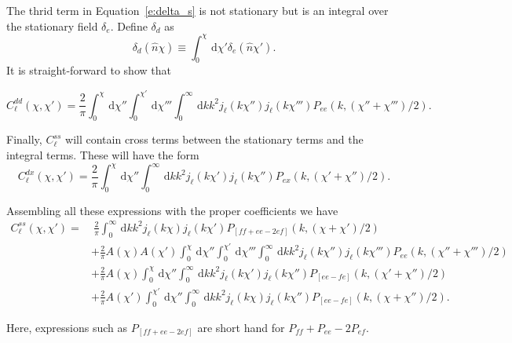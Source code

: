 \documentclass[twocolumn,prl,nofootinbib]{revtex4-1}
\newcommand{\ud}{\,\mathrm{d}}
\begin{document}
The thrid term in Equation~\ref{e:delta_s} is not stationary but is an integral
over the stationary field $\delta_e$.
Define $\delta_d$ as
\begin{equation}
    \delta_d(\hat n \chi) \equiv \int_0^\chi \ud \chi' \delta_e(\hat n \chi').
\end{equation}
It is straight-forward to show that
\begin{widetext}
\begin{equation}
C^{dd}_\ell(\chi,\chi')
    =
    \frac{2}{\pi}
    \int_0^\chi\ud\chi''
    \int_0^{\chi'}\ud\chi'''
    \int_0^\infty\ud k k^2 j_\ell(k\chi'') j_{\ell}(k\chi''')
    P_{ee}(k, (\chi''+\chi''')/2).
\end{equation}

Finally, $C^{ss}_\ell$ will contain cross terms between the stationary terms
and the integral terms.  These will have the form
\begin{equation}
C^{dx}_\ell(\chi,\chi')
    =
    \frac{2}{\pi}
    \int_0^\chi\ud\chi''
    \int_0^\infty\ud k k^2 
    j_\ell(k\chi') j_{\ell}(k\chi'')P_{ex}(k, (\chi' + \chi'')/2).
\end{equation}

Assembling all these expressions with the proper coefficients we have
\begin{align}
    \label{e:Clss}
C^{ss}_\ell(\chi,\chi') = &~
    \frac{2}{\pi}
    \int_0^\infty\ud k k^2
    j_\ell(k\chi) j_{\ell}(k\chi')
    P_{[ff + ee - 2ef]}(k, (\chi + \chi')/2)
    \nonumber\\
    & +
    \frac{2}{\pi}
    A(\chi) A(\chi')
    \int_0^\chi\ud\chi''
    \int_0^{\chi'}\ud\chi'''
    \int_0^\infty\ud k k^2 j_\ell(k\chi'') j_{\ell}(k\chi''')
    P_{ee}(k, (\chi''+\chi''')/2)
    \nonumber\\
    & +
    \frac{2}{\pi}
    A(\chi)
    \int_0^\chi\ud\chi''
    \int_0^\infty\ud k k^2 
    j_\ell(k\chi') j_{\ell}(k\chi'')
    P_{[ee - fe]}(k, (\chi' + \chi'')/2)
    \nonumber\\
    & +
    \frac{2}{\pi}
    A(\chi')
    \int_0^{\chi'}\ud\chi''
    \int_0^\infty\ud k k^2 
    j_\ell(k\chi) j_{\ell}(k\chi'')
    P_{[ee - fe]}(k, (\chi + \chi'')/2).
\end{align}
\end{widetext}
Here, expressions such as $P_{[ff + ee - 2ef]}$ are short hand for $P_{ff} +
P_{ee} - 2P_{ef}$.
\end{document}
